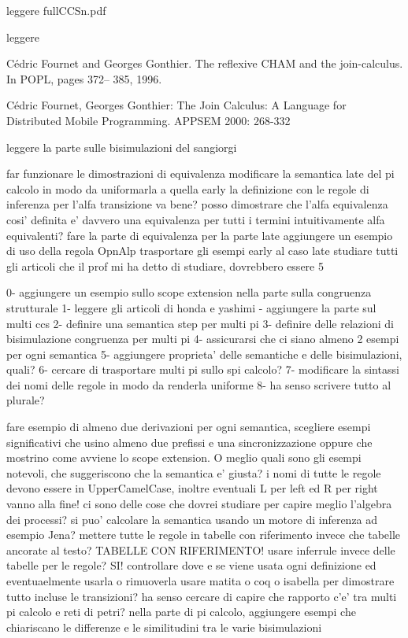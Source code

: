 
leggere fullCCSn.pdf

leggere 

Cédric Fournet and Georges Gonthier. The reflexive
CHAM and the join-calculus. In POPL, pages 372–
385, 1996.

Cédric Fournet, Georges Gonthier: The Join Calculus:
A Language for Distributed Mobile Programming.
APPSEM 2000: 268-332



leggere la parte sulle bisimulazioni del sangiorgi



















far funzionare le dimostrazioni di equivalenza
modificare la semantica late del pi calcolo in modo da uniformarla a quella early
la definizione con le regole di inferenza per l'alfa transizione va bene? posso dimostrare che l'alfa equivalenza cosi' definita e' davvero una equivalenza per tutti i termini intuitivamente alfa equivalenti?
fare la parte di equivalenza per la parte late
aggiungere un esempio di uso della regola OpnAlp
trasportare gli esempi early al caso late
studiare tutti gli articoli che il prof mi ha detto di studiare, dovrebbero essere 5



0- aggiungere un esempio sullo scope extension nella parte sulla congruenza strutturale
1- leggere gli articoli di honda e yashimi
 - aggiungere la parte sul multi ccs
2- definire una semantica step per multi pi
3- definire delle relazioni di bisimulazione congruenza per multi pi
4- assicurarsi che ci siano almeno 2 esempi per ogni semantica
5- aggiungere proprieta' delle semantiche e delle bisimulazioni, quali?
6- cercare di trasportare multi pi sullo spi calcolo?
7- modificare la sintassi dei nomi delle regole in modo da renderla uniforme
8- ha senso scrivere tutto al plurale?


fare esempio di almeno due derivazioni per ogni semantica, scegliere esempi significativi che usino almeno due prefissi e una sincronizzazione oppure che mostrino come avviene lo scope extension.
O meglio quali sono gli esempi notevoli, che suggeriscono che la semantica e' giusta?
i nomi di tutte le regole devono essere in UpperCamelCase, inoltre eventuali L per left ed R per right vanno alla fine!
ci sono delle cose che dovrei studiare per capire meglio l'algebra dei processi?
si puo' calcolare la semantica usando un motore di inferenza ad esempio Jena?
mettere tutte le regole in tabelle con riferimento invece che tabelle ancorate al testo? TABELLE CON RIFERIMENTO!
usare inferrule invece delle tabelle per le regole? SI!
controllare dove e se viene usata ogni definizione ed eventuaelmente usarla o rimuoverla
usare matita o coq o isabella per dimostrare tutto incluse le transizioni?
ha senso cercare di capire che rapporto c'e' tra multi pi calcolo e reti di petri?
nella parte di pi calcolo, aggiungere esempi che chiariscano le differenze e le similitudini tra le varie bisimulazioni



